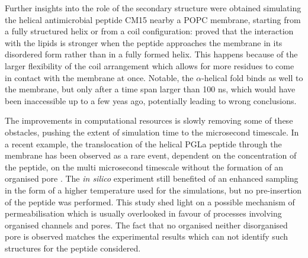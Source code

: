 Further insights into the role of the secondary structure were obtained simulating the helical antimicrobial peptide CM15 nearby a POPC membrane, starting from a fully structured helix or from a coil configuration: \citet{Wang2012} proved that the interaction with the lipids is stronger when the peptide approaches the membrane in its disordered form rather than in a fully formed helix. This happens because of the larger flexibility of the coil arrangement which allows for more residues to come in contact with the membrane at once. Notable, the $\alpha$-helical fold binds as well to the membrane, but only after a time span larger than 100 ns, which would have been inaccessible up to a few yeas ago, potentially leading to wrong conclusions.

The improvements in computational resources is slowly removing some of these obstacles, pushing the extent of simulation time to the microsecond timescale.
%
In a recent example, the translocation of the helical PGLa peptide through the membrane has been observed as a rare event, dependent on the concentration of the peptide, on the multi microsecond timescale without the formation of an organised pore \citep{Ulmschneider2017}. The \emph{in silico} experiment still benefited of an enhanced sampling in the form of a higher temperature used for the simulations, but no pre-insertion of the peptide was performed.  This study shed light on a possible mechanism of permeabilisation which is usually overlooked in favour of processes involving organised channels and pores. The fact that no organised neither disorganised pore is observed matches the experimental results which can not identify such structures for the peptide considered. 

